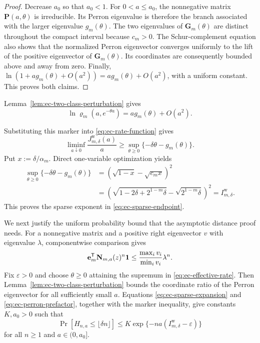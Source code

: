 \begin{proof}
Decrease $a_0$ so that $a_0<1$.  For $0<a\leq a_0$, the nonnegative matrix
$\mathbf P(a,\theta)$ is irreducible.  Its Perron eigenvalue is therefore the
branch associated with the larger eigenvalue $g_m(\theta)$.  The two
eigenvalues of $\mathbf G_m(\theta)$ are distinct throughout the compact
interval because $c_m>0$.  The Schur-complement equation also shows that the
normalized Perron eigenvector converges uniformly to the lift of the positive
eigenvector of $\mathbf G_m(\theta)$.  Its coordinates are consequently
bounded above and away from zero.  Finally,
$\ln(1+a g_m(\theta)+O(a^2))=a g_m(\theta)+O(a^2)$, with a uniform constant.
This proves both claims.
\end{proof}

Lemma~\ref{lem:ec-two-class-perturbation} gives
\begin{equation}
 \ln\varrho_m(a,e^{-\theta a})
 =a g_m(\theta)+O(a^2).
 \label{eq:ec-sparse-expansion}
\end{equation}

Substituting this marker into \eqref{eq:ec-rate-function} gives
\begin{equation}
 \liminf_{a\downarrow0}\frac{J^{\mathrm w}_{m,\delta}(a)}a
 \geq\sup_{\theta\geq0}\{-\delta\theta-g_m(\theta)\}.
 \label{eq:ec-effective-optimization}
\end{equation}
Put $x:=\delta/\alpha_m$.  Direct one-variable optimization yields
\begin{align}
 \sup_{\theta\geq0}\{-\delta\theta-g_m(\theta)\}
 &=\left(\sqrt{1-x}-\sqrt{c_mx}\right)^2\\
 &=\left(
 \sqrt{1-2\delta+2^{1-m}\delta}
 -\sqrt{2^{1-m}\delta}
 \right)^2
 =I^{\mathrm w}_{m,\delta}.
 \label{eq:ec-effective-rate}
\end{align}
This proves the sparse exponent in \eqref{eq:ec-sparse-endpoint}.

We next justify the uniform probability bound that the asymptotic distance
proof needs.  For a nonnegative matrix and a positive right eigenvector $v$ with
eigenvalue $\lambda$, componentwise comparison gives
\begin{equation}
 \mathbf e_m^{\mathsf T}\mathbf N_{m,a}(z)^n\mathbf 1
 \leq \frac{\max_i v_i}{\min_i v_i}\lambda^n.
 \label{eq:ec-perron-prefactor}
\end{equation}
Fix $\varepsilon>0$ and choose $\theta\geq0$ attaining the supremum in
\eqref{eq:ec-effective-rate}.  Then
Lemma~\ref{lem:ec-two-class-perturbation} bounds the coordinate ratio of the
Perron eigenvector for all sufficiently small $a$.  Equations
\eqref{eq:ec-sparse-expansion} and \eqref{eq:ec-perron-prefactor}, together
with the marker inequality, give constants $K,a_0>0$ such that
\begin{equation}
 \Pr[H_{n,a}\leq\lfloor\delta n\rfloor]
 \leq K\exp\{-na(I^{\mathrm w}_{m,\delta}-\varepsilon)\}
 \label{eq:ec-uniform-sparse-tail}
\end{equation}
for all $n\geq1$ and $a\in(0,a_0]$.

